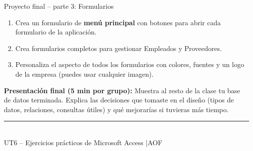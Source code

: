 \documentclass[12pt,a4paper]{article}
\begin{document}
\begin{practica}{Proyecto final -- parte 3: Formularios}
\begin{enumerate}
  \item Crea un formulario de \textbf{menú principal} con botones para abrir cada formulario de la aplicación.
  \item Crea formularios completos para gestionar Empleados y Proveedores.
  \item Personaliza el aspecto de todos los formularios con colores, fuentes y un logo de la empresa (puedes usar cualquier imagen).
\end{enumerate}
\end{practica}

\begin{reflexion}
\textbf{Presentación final (5 min por grupo):} Muestra al resto de la clase tu base de datos terminada. Explica las decisiones que tomaste en el diseño (tipos de datos, relaciones, consultas útiles) y qué mejorarías si tuvieras más tiempo.
\end{reflexion}

\vfill
\begin{center}
{\color{accessred}\rule{0.5\linewidth}{1pt}}\\[0.3cm]
{\small\color{gray} UT6 -- Ejercicios prácticos de Microsoft Access \quad|\quad AOF}
\end{center}
\end{document}
